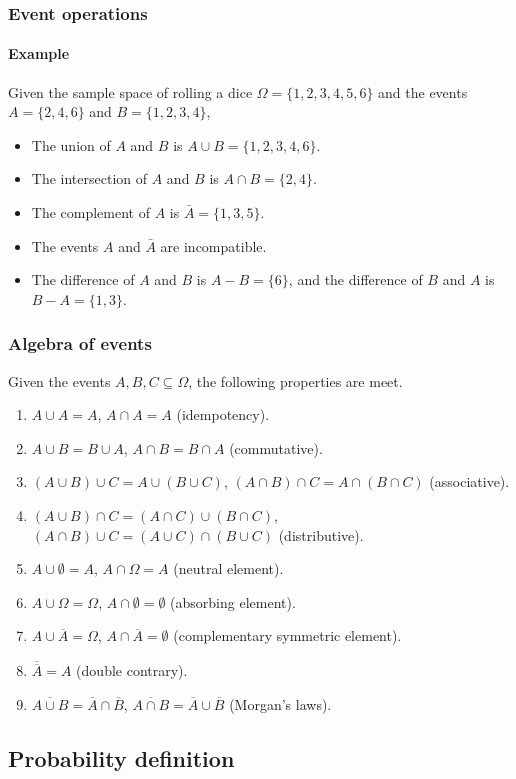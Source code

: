 \begin{frame}
\frametitle{Event operations}
\framesubtitle{Example}
Given the sample space of rolling a dice $\Omega=\{1,2,3,4,5,6\}$ and the events $A=\{2,4,6\}$ and $B=\{1,2,3,4\}$, 
\begin{itemize}
\item The union of $A$ and $B$ is $A\cup B=\{1,2,3,4,6\}$.
\item The intersection of $A$ and $B$ is $A\cap B=\{2,4\}$.
\item The complement of $A$ is $\bar A=\{1,3,5\}$.
\item The events $A$ and $\bar A$ are incompatible.
\item The difference of $A$ and $B$ is $A-B=\{6\}$, and the difference of $B$ and $A$ is $B-A=\{1,3\}$.
\end{itemize}
\end{frame}


\begin{frame}
\frametitle{Algebra of events}
Given the events $A,B,C\subseteq \Omega$, the following properties are meet. 
\begin{enumerate}
\item $A\cup A=A$, $A\cap A=A$ (idempotency).
\item $A\cup B=B\cup A$, $A\cap B = B\cap A$ (commutative).
\item $(A\cup B)\cup C = A\cup (B\cup C)$, $(A\cap B)\cap C = A\cap (B\cap C)$ (associative).
\item $(A\cup B)\cap C = (A\cap C)\cup (B\cap C)$, $(A\cap B)\cup C = (A\cup C)\cap (B\cup C)$ (distributive).
\item $A\cup \emptyset=A$, $A\cap \Omega=A$ (neutral element).
\item $A\cup \Omega=\Omega$, $A\cap \emptyset=\emptyset$ (absorbing element).
\item $A\cup \overline A = \Omega$, $A\cap \overline A= \emptyset$ (complementary symmetric element).
\item $\overline{\overline A} = A$ (double contrary).
\item $\overline{A\cup B} = \overline A\cap \overline B$, $\overline{A\cap B} = \overline A\cup \overline B$ (Morgan's
laws).
\end{enumerate}
\end{frame}


\subsection{Probability definition}

